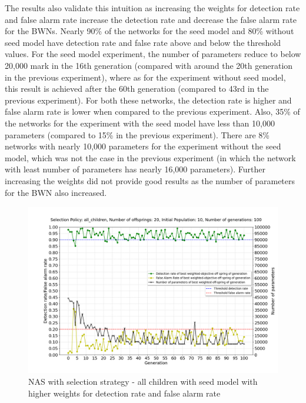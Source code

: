 The results also validate this intuition as increasing the weights for detection rate and false alarm rate increase the detection rate and decrease the false alarm rate for the BWNs. Nearly 90\% of the networks for the seed model and 80\% without seed model have detection rate and false rate above and below the threshold values. For the seed model experiment, the number of parameters reduce to below 20,000 mark in the 16th generation (compared with around the 20th generation in the previous experiment), where as for the experiment without seed model, this result is achieved after the 60th generation (compared to 43rd in the previous experiment). For both these networks, the detection rate is higher and false alarm rate is lower when compared to the previous experiment. Also, 35\% of the networks for the experiment with the seed model have less than 10,000 parameters (compared to 15\% in the previous experiment). There are 8\% networks with nearly 10,000 parameters for the experiment without the seed model, which was not the case in the previous experiment (in which the network with least number of parameters has nearly 16,000 parameters). Further increasing the weights did not provide good results as the number of parameters for the BWN also increased. 

\begin{figure}[ht!]
    \centering
        \includegraphics[width=1.0\linewidth, height=7.5cm]{BachelorMasterThesis/ExperimentsAndResults/Figures/all_children/all_children_5_5_1_seed_model_mutation_rate_10_30_5_10.png}
        \caption{NAS with selection strategy - all children with seed model with higher weights for detection rate and false alarm rate}
        \label{fig:all_children_5_5_1_seed_model_mutation_rate_10_30_5_10}
\end{figure}

